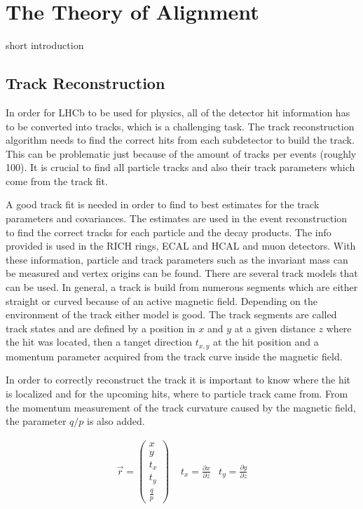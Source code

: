 \chapter{The Theory of Alignment}
\label{sec:alignTheory}

short introduction

\section{Track Reconstruction}
\label{sec:kalman}

In order for LHCb to be used for physics, all of the detector hit information has to be converted into tracks, which is a challenging task.
The track reconstruction algorithm needs to find the correct hits from each subdetector to build the track. This can be problematic just because of the amount of tracks per events (roughly 100).
It is crucial to find all particle tracks and also their track parameters which come from the track fit.

A good track fit is needed in order to find to best estimates for the track parameters and covariances. The estimates are used in the event reconstruction to find the correct tracks for each particle and the decay products. The info provided is used in the RICH rings, ECAL and HCAL and muon detectors. With these information, particle and track parameters such as the invariant mass can be measured and vertex origins can be found.
There are several track models that can be used. In general, a track is build from numerous segments which are either straight or curved because of an active magnetic field. Depending on the environment of the track either model is good.
The track segments are called track states and are defined by a position in $x$ and $y$ at a given distance $z$ where the hit was located, then a tanget direction $t_{x,y}$ at the hit position and a momentum parameter acquired from the track curve inside the magnetic field\cite{VanTilburg}.

In order to correctly reconstruct the track it is important to know where the hit is localized and for the upcoming hits, where to particle track came from. From the momentum measurement of the track curvature caused by the magnetic field, the parameter $q/p$ is also added.

\begin{align*}
  \vec{r} = \left(\begin{array}{c} x \\ y \\ t_x \\ t_y \\ \frac{q}{p}\end{array}\right) &\,\, t_x = \frac{\partial x}{\partial z} & t_y = \frac{\partial y}{\partial z}
\end{align*}

